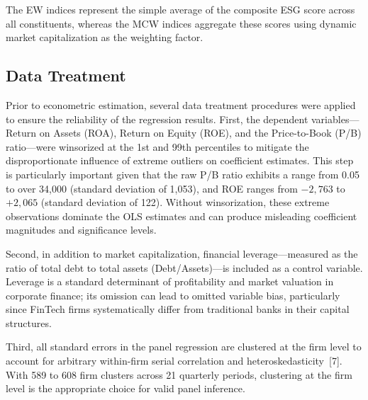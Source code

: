 \documentclass[12pt]{article}
\begin{document}
The EW indices represent the simple average of the composite ESG score across all constituents, whereas the MCW indices aggregate these scores using dynamic market capitalization as the weighting factor.

\subsection{Data Treatment}
Prior to econometric estimation, several data treatment procedures were applied to ensure the reliability of the regression results. First, the dependent variables---Return on Assets (ROA), Return on Equity (ROE), and the Price-to-Book (P/B) ratio---were winsorized at the 1st and 99th percentiles to mitigate the disproportionate influence of extreme outliers on coefficient estimates. This step is particularly important given that the raw P/B ratio exhibits a range from 0.05 to over 34{,}000 (standard deviation of 1{,}053), and ROE ranges from $-2{,}763$ to $+2{,}065$ (standard deviation of 122). Without winsorization, these extreme observations dominate the OLS estimates and can produce misleading coefficient magnitudes and significance levels.

Second, in addition to market capitalization, financial leverage---measured as the ratio of total debt to total assets (Debt/Assets)---is included as a control variable. Leverage is a standard determinant of profitability and market valuation in corporate finance; its omission can lead to omitted variable bias, particularly since FinTech firms systematically differ from traditional banks in their capital structures.

Third, all standard errors in the panel regression are clustered at the firm level to account for arbitrary within-firm serial correlation and heteroskedasticity~[7]. With 589 to 608 firm clusters across 21 quarterly periods, clustering at the firm level is the appropriate choice for valid panel inference.
\end{document}
